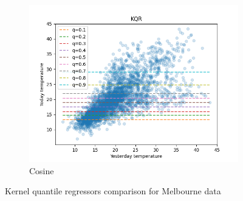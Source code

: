 \begin{figure}[!h]
\begin{subfigure}[b]{0.5\linewidth}
    \end{subfigure}
    \begin{subfigure}[b]{0.5\linewidth}
        \centering
        \includegraphics[width=1.1\textwidth]{images/melbourne_cosine_kernel_quantile_regression.png}
        \caption{Cosine} 
        \label{} 
    \end{subfigure} 
    \caption{Kernel quantile regressors comparison for Melbourne data}
    \label{fig:kernel quantile regressors comparison} 
\end{figure}

% 

% 



